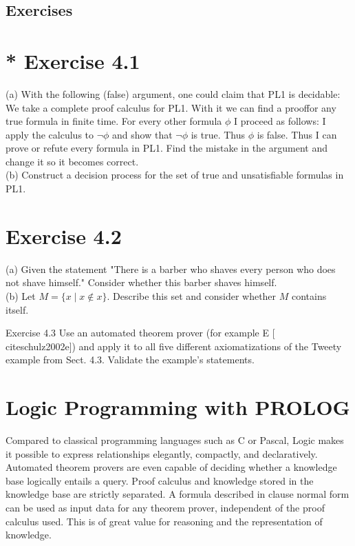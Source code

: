 \documentclass[10pt]{book}
\begin{document}
\subsection*{Exercises}
\section*{* Exercise 4.1}
(a) With the following (false) argument, one could claim that PL1 is decidable: We take a complete proof calculus for PL1. With it we can find a prooffor any true formula in finite time. For every other formula $\phi$ I proceed as follows: I apply the calculus to $\neg \phi$ and show that $\neg \phi$ is true. Thus $\phi$ is false. Thus I can prove or refute every formula in PL1. Find the mistake in the argument and change it so it becomes correct.\\

(b) Construct a decision process for the set of true and unsatisfiable formulas in PL1.

\section*{Exercise 4.2}
(a) Given the statement "There is a barber who shaves every person who does not shave himself." Consider whether this barber shaves himself.\\
(b) Let $M=\{x \mid x \notin x\}$. Describe this set and consider whether $M$ contains itself.

Exercise 4.3 Use an automated theorem prover (for example E [\\cite{schulz2002e}]) and apply it to all five different axiomatizations of the Tweety example from Sect. 4.3. Validate the example's statements.

\section*{Logic Programming with PROLOG}
Compared to classical programming languages such as C or Pascal, Logic makes it possible to express relationships elegantly, compactly, and declaratively. Automated theorem provers are even capable of deciding whether a knowledge base logically entails a query. Proof calculus and knowledge stored in the knowledge base are strictly separated. A formula described in clause normal form can be used as input data for any theorem prover, independent of the proof calculus used. This is of great value for reasoning and the representation of knowledge.
\end{document}
